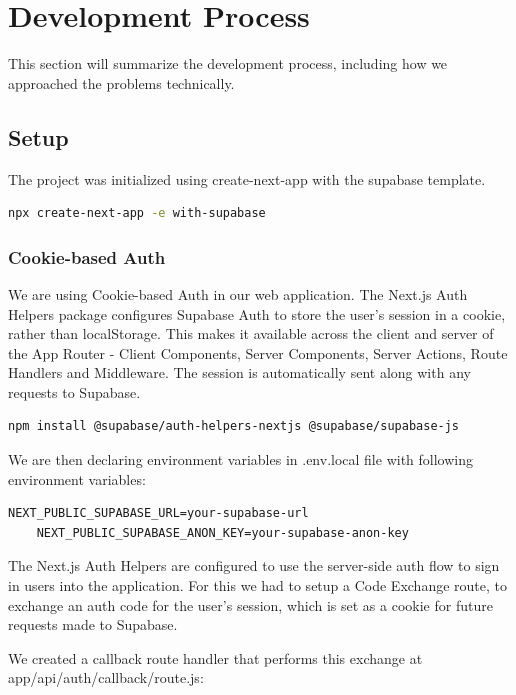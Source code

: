 \section{Development Process}

This section will summarize the development process, including how we approached the problems technically.

\subsection{Setup}

The project was initialized using create-next-app with the supabase template.\medskip
\begin{lstlisting}[language=bash]
    npx create-next-app -e with-supabase
\end{lstlisting}

\subsubsection{Cookie-based Auth}
We are using Cookie-based Auth in our web application. The Next.js Auth Helpers package configures Supabase Auth to store the user's session in a cookie, rather than localStorage. This makes it available across the client and server of the App Router - Client Components, Server Components, Server Actions, Route Handlers and Middleware. The session is automatically sent along with any requests to Supabase.\smallskip

\begin{lstlisting}[language=bash, caption={Installing Auth Helpers}]
npm install @supabase/auth-helpers-nextjs @supabase/supabase-js
\end{lstlisting}
\noindent
We are then declaring environment variables in .env.local file with following environment variables:
\begin{lstlisting}[caption={.env.local}]
    NEXT_PUBLIC_SUPABASE_URL=your-supabase-url
    NEXT_PUBLIC_SUPABASE_ANON_KEY=your-supabase-anon-key
\end{lstlisting}

The Next.js Auth Helpers are configured to use the server-side auth flow to sign in users
into the application. For this we had to setup a Code Exchange route, to exchange an auth
code for the user's session, which is set as a cookie for future requests made to Supabase.

We created a callback route handler that performs this exchange at app/api/auth/callback/route.js:


